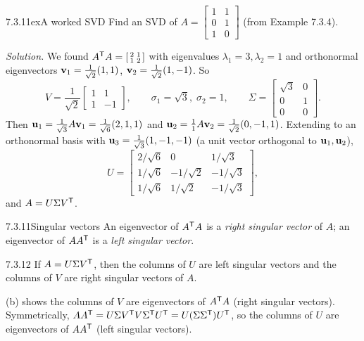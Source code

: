 \begin{exmp}{7.3.11ex}{A worked SVD}
Find an SVD of $A=\left[\begin{smallmatrix}1&1\\0&1\\1&0\end{smallmatrix}\right]$ (from Example 7.3.4).

\smallskip
\noindent\textit{Solution.} We found $A^{\mathsf{T}} A=\left[\begin{smallmatrix}2&1\\1&2\end{smallmatrix}\right]$ with eigenvalues $\lambda_1=3,\lambda_2=1$ and orthonormal eigenvectors $\mathbf{v}_1=\tfrac{1}{\sqrt2}(1,1)$, $\mathbf{v}_2=\tfrac{1}{\sqrt2}(1,-1)$. So
\[
V=\frac1{\sqrt2}\begin{bmatrix}1&1\\1&-1\end{bmatrix},\qquad \sigma_1=\sqrt3,\;\sigma_2=1,\qquad \Sigma=\begin{bmatrix}\sqrt3&0\\0&1\\0&0\end{bmatrix}.
\]
Then $\mathbf{u}_1=\tfrac{1}{\sqrt3}A\mathbf{v}_1=\tfrac{1}{\sqrt6}(2,1,1)$ and $\mathbf{u}_2=\tfrac11 A\mathbf{v}_2=\tfrac1{\sqrt2}(0,-1,1)$. Extending to an orthonormal basis with $\mathbf{u}_3=\tfrac1{\sqrt3}(1,-1,-1)$ (a unit vector orthogonal to $\mathbf{u}_1,\mathbf{u}_2$),
\[
U=\begin{bmatrix}2/\sqrt6&0&1/\sqrt3\\1/\sqrt6&-1/\sqrt2&-1/\sqrt3\\1/\sqrt6&1/\sqrt2&-1/\sqrt3\end{bmatrix},
\]
and $A=U\Sigma V^{\mathsf{T}}$.
\end{exmp}

\begin{defns}{7.3.11}{Singular vectors}
An eigenvector of $A^{\mathsf{T}} A$ is a \emph{right singular vector} of $A$; an eigenvector of $AA^{\mathsf{T}}$ is a \emph{left singular vector}.
\end{defns}

\begin{lems}{7.3.12}{}
If $A=U\Sigma V^{\mathsf{T}}$, then the columns of $U$ are left singular vectors and the columns of $V$ are right singular vectors of $A$.
\end{lems}

\begin{prf}
(b) shows the columns of $V$ are eigenvectors of $A^{\mathsf{T}} A$ (right singular vectors). Symmetrically, $AA^{\mathsf{T}}=U\Sigma V^{\mathsf{T}} V\Sigma^{\mathsf{T}} U^{\mathsf{T}}=U(\Sigma\Sigma^{\mathsf{T}})U^{\mathsf{T}}$, so the columns of $U$ are eigenvectors of $AA^{\mathsf{T}}$ (left singular vectors).
\end{prf}


